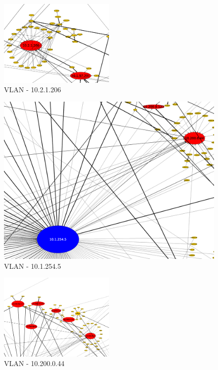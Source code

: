 \begin{figure}[!htb]
    \centering
    \includegraphics[width=0.5\textwidth]{img/graph/escenario_1/vlan1/vlan1_1000toEnd_10_2_1_206}
    \caption{VLAN  - 10.2.1.206}
    \label{fig:vlan1_grafo_10_2_1_206}
\end{figure}

\begin{figure}
    \centering
    \includegraphics[width=\textwidth]{img/graph/escenario_1/vlan1/vlan1_1000toEnd_10_1_254_5}
    \caption{VLAN  - 10.1.254.5}
    \label{fig:vlan1_grafo_10_1_254_5}
\end{figure}

\begin{figure}[!ht]
    \centering
    \includegraphics[width=0.5\textwidth]{img/graph/escenario_1/vlan1/vlan1_1000toEnd_10_200_0_44}
    \caption{VLAN  - 10.200.0.44}
    \label{fig:vlan1_grafo_10_200_0_44}
\end{figure}

\FloatBarrier
